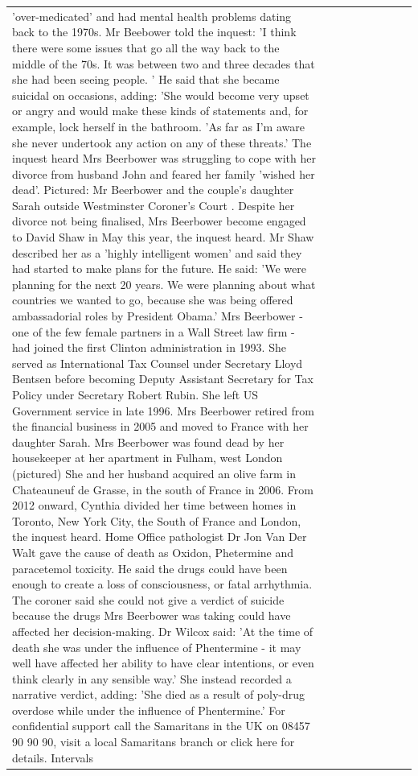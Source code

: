 \begin{table}[H]
\begin{tabular}{lllrlllll}
'over-medicated' and had mental health problems dating back to the 1970s. Mr Beebower told the inquest: 'I think there were some issues that go all the way back to the middle of the 70s. It was between two and three decades that she had been seeing people. ' He said that she became suicidal on occasions, adding: 'She would become very upset or angry and would make these kinds of statements and, for example, lock herself in the bathroom. 'As far as I'm aware she never undertook any action on any of these threats.' The inquest heard Mrs Beerbower was struggling to cope with her divorce from husband John and feared her family 'wished her dead'. Pictured: Mr Beerbower and the couple's daughter Sarah outside Westminster Coroner's Court . Despite her divorce not being finalised, Mrs Beerbower become engaged to David Shaw in May this year, the inquest heard. Mr Shaw described her as a 'highly intelligent women' and said they had started to make plans for the future. He said: 'We were planning for the next 20 years. We were planning about what countries we wanted to go, because she was being offered ambassadorial roles by President Obama.' Mrs Beerbower - one of the few female partners in a Wall Street law firm - had joined the first Clinton administration in 1993. She served as International Tax Counsel under Secretary Lloyd Bentsen before becoming Deputy Assistant Secretary for Tax Policy under Secretary Robert Rubin. She left US Government service in late 1996. Mrs Beerbower retired from the financial business in 2005 and moved to France with her daughter Sarah. Mrs Beerbower was found dead by her housekeeper at her apartment in Fulham, west London (pictured) She and her husband acquired an olive farm in Chateauneuf de Grasse, in the south of France in 2006. From 2012 onward, Cynthia divided her time between homes in Toronto, New York City, the South of France and London, the inquest heard. Home Office pathologist Dr Jon Van Der Walt gave the cause of death as Oxidon, Phetermine and paracetemol toxicity. He said the drugs could have been enough to create a loss of consciousness, or fatal arrhythmia. The coroner said she could not give a verdict of suicide because the drugs Mrs Beerbower was taking could have affected her decision-making. Dr Wilcox said: 'At the time of death she was under the influence of Phentermine - it may well have affected her ability to have clear intentions, or even think clearly in any sensible way.' She instead recorded a narrative verdict, adding: 'She died as a result of poly-drug overdose while under the influence of Phentermine.' For confidential support call the Samaritans in the UK on 08457 90 90 90, visit a local Samaritans branch or click here for details. Intervals \\

\end{tabular}
\end{table}
